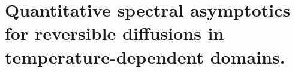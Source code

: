 \chapter{Quantitative spectral asymptotics for reversible diffusions in temperature-dependent domains.}
\label{chap:overdamped}